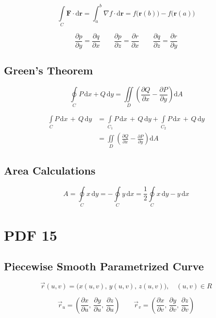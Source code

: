 \documentclass[12pt, fleqn]{book}
\newcommand{\D}{\mathrm{d}}
\newcommand{\ic}{\int\limits_C}
\newcommand{\oic}{\oint\limits_C}
\newcommand{\F}{\mathbf{F}}
\newcommand{\br}{\mathbf{r}}
\newcommand{\uv}{(u, v)}
\newcommand{\rond}[2]{\frac{\partial #1}{\partial #2}}
\begin{document}
		\begin{equation}
			\ic  \F \cdot \D \br = \int_{a}^{b} \nabla f \cdot \D \br = f\big(\br(b)\big) - f\big(\br(a)\big)
		\end{equation}     
	
		\begin{equation}
			\rond{p}{y} = \rond{q}{x} \qquad
			\rond{p}{z} = \rond{r}{x} \qquad
			\rond{q}{z} = \rond{r}{y}
		\end{equation}
	
	\section{Green's Theorem}
		\begin{equation}
			\oic  P \, \D x + Q \, \D y = \iint\limits_D \left(\rond{Q}{x} - \rond{P}{y}\right) \D A
		\end{equation}
	
		\begin{equation}
			\begin{split}
				\ic  P \, \D x \, + \, Q \, \D y & = \int\limits_{C_{1}} P \, \D x \, + \, Q \, \D y + \int\limits_{C_{2}} P \, \D x \, + \, Q \, \D y \\ 
				& = \iint\limits_D \left(\rond{Q}{x} - \rond{P}{y}\right) \D A
			\end{split}
		\end{equation}		    
	\section{Area Calculations}
		\begin{equation}
			A = \oic  x \, \D y = - \oic  y \, \D x = \frac{1}{2} \oic  x \, \D y - y \, \D x
		\end{equation}		
\chapter{PDF 15}\label{pdf15}
	\section{Piecewise Smooth Parametrized Curve}
		\begin{equation}
			\vec{r}\uv = \big(x\uv, \, y\uv, \, z\uv\big), \quad \uv \in R
		\end{equation}

		\begin{equation}
			\vec{r}_u = (\rond{x}{u}, \, \rond{y}{u}, \, \rond{z}{u}) \qquad \vec{r}_v = (\rond{x}{v}, \, \rond{y}{v}, \, \rond{z}{v}) 
		\end{equation}	
\end{document}
